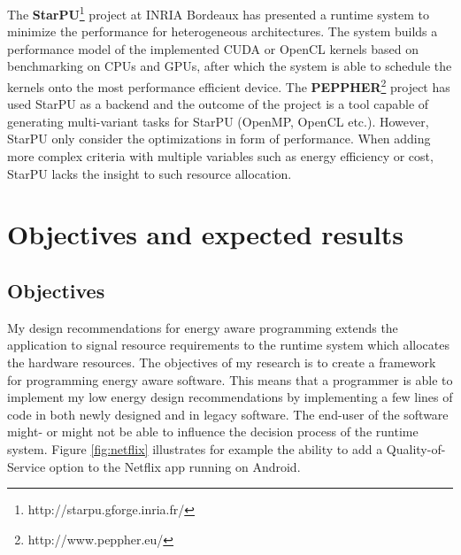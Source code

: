\documentclass{article}
\begin{document}
The \textbf{StarPU}\footnote{http://starpu.gforge.inria.fr/} project at INRIA Bordeaux has presented a runtime system to minimize the performance for heterogeneous architectures. The system builds a performance model of the implemented CUDA or OpenCL kernels based on benchmarking on CPUs and GPUs, after which the system is able to schedule the kernels onto the most performance efficient device. The \textbf{PEPPHER}\footnote{http://www.peppher.eu/} project has used StarPU as a backend and the outcome of the project is a tool capable of generating multi-variant tasks for StarPU (OpenMP, OpenCL etc.). However, StarPU only consider the optimizations in form of performance. When adding more complex criteria with multiple variables such as energy efficiency or cost, StarPU lacks the insight to such resource allocation.

\section{Objectives and expected results}
\subsection{Objectives}
My design recommendations for energy aware programming extends the application to signal resource requirements to the runtime system which allocates the hardware resources.
The objectives of my research is to create a framework for programming energy aware software. 
This means that a programmer is able to implement my low energy design recommendations by implementing a few lines of code in both newly designed and in legacy software.
The end-user of the software might- or might not be able to influence the decision process of the runtime system. 
Figure \ref{fig:netflix} illustrates for example the ability to add a Quality-of-Service option to the Netflix app running on Android. 
\end{document}
